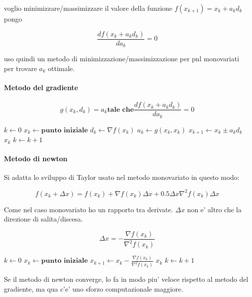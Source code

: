 voglio minimizzare/massimizzare il valore della funzione $f(x_{k+1}) = x_k + a_k d_k$ pongo

\[
    \frac {df(x_k + a_k d_k)} {da_k} = 0
\]

uso quindi un metodo di minimizzazione/massimizzazione per pnl monovariati per trovare $a_k$ ottimale.

\paragraph{Metodo del gradiente}

\[
    g(x_k, d_k) = a_k \textbf{tale che}
    \frac {df(x_k + a_k d_k)} {da_k} = 0
\]

\begin{algorithm}
    \begin{algorithmic}
            \State $k \gets 0$
            \State $x_k \gets \textbf{punto iniziale}$
                \State $d_k \gets \nabla f(x_k)$
                \State $a_k \gets g(x_k, x_k)$
                \State $x_{k+1} \gets x_k \pm a_k d_k$
                    \State \Return $x_k$
                \Else
                    \State $k \gets k+1$
                \EndIf
            \EndWhile
        \EndProcedure
    \end{algorithmic}
\end{algorithm}

\paragraph{Metodo di newton}

Si adatta lo sviluppo di Taylor usato nel metodo monovariato in questo modo:

\[
    f(x_k + \Delta x) = f(x_k) + \nabla f(x_k) \Delta x + 0.5 \Delta x \nabla^2 f(x_k) \Delta x
\]

Come nel caso monovariato ho un rapporto tra derivate. $\Delta x$ non e' altro che la direzione di salita/discesa.

\[
    \Delta x = - \frac {\nabla f(x_k)} {\nabla^2 f(x_k)}
\]

\begin{algorithm}
    \begin{algorithmic}
            \State $k \gets 0$
            \State $x_k \gets \textbf{punto iniziale}$
                \State $x_{k+1} \gets x_k - \frac {\nabla f(x_k)} {\nabla^2 f(x_k)}$
                    \State \Return $x_k$
                \Else
                    \State $k \gets k+1$
                \EndIf
            \EndWhile
        \EndProcedure
    \end{algorithmic}
\end{algorithm}

Se il metodo di newton converge, lo fa in modo piu' veloce rispetto al metodo del gradiente, ma qua c'e' uno sforzo computazionale maggiore.
